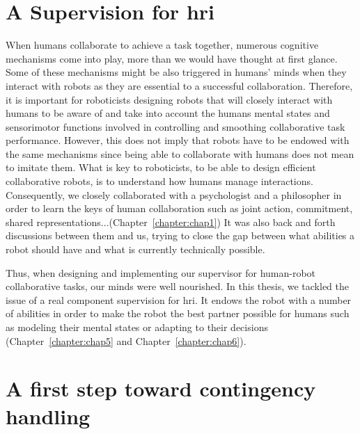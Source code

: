 \documentclass[a4paper,11pt,twoside]{StyleThese}
\begin{document}
\section*{A Supervision for \acrlong{hri}}
When humans collaborate to achieve a task together, numerous cognitive mechanisms come into play, more than we would have thought at first glance. Some of these mechanisms might be also triggered in humans’ minds when they interact with robots as they are essential to a successful collaboration. Therefore, it is important for roboticists designing robots that will closely interact with humans to be aware of and take into account the humans mental states and sensorimotor functions involved in controlling and smoothing collaborative task performance. However, this does not imply that robots have to be endowed with the same mechanisms since being able to collaborate with humans does not mean to imitate them. What is key to roboticists, to be able to design efficient collaborative robots, is to understand how humans manage interactions. Consequently, we closely collaborated with a psychologist and a philosopher in order to learn the keys of human collaboration such as joint action, commitment, shared representations...(Chapter~\ref{chapter:chap1}) It was also back and forth discussions between them and us, trying to close the gap between what abilities a robot should have and what is currently technically possible.

Thus, when designing and implementing our supervisor for human-robot collaborative tasks, our minds were well nourished. In this thesis, we tackled the issue of a real component supervision for \acrshort{hri}. It endows the robot with a number of abilities in order to make the robot the best partner possible for humans such as modeling their mental states or adapting to their decisions (Chapter~\ref{chapter:chap5} and Chapter~\ref{chapter:chap6}).

\section*{A first step toward contingency handling}
\end{document}
